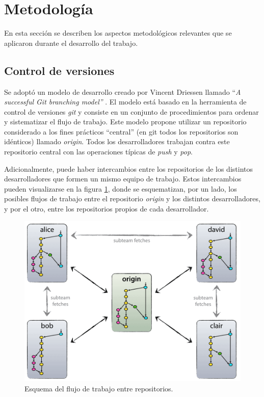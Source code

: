 


\section{Metodología}

En esta sección se describen los aspectos metodológicos relevantes que se aplicaron durante el desarrollo del trabajo.  

\subsection{Control de versiones}
\label{subsec:branching}

Se adoptó un modelo de desarrollo creado por Vincent Driessen llamado ``\textit{A successful Git branching model''} \citep{Driessen}.  El modelo está basado en la herramienta de control de versiones \textit{git} y consiste en un conjunto de procedimientos para ordenar y sistematizar el flujo de trabajo. Este modelo propone utilizar un repositorio considerado a los fines prácticos ``central'' (en git todos los repositorios son idénticos) llamado \textit{origin}.  Todos los desarrolladores trabajan contra este repositorio central con las operaciones típicas de \textit{push} y \textit{pop}.  

Adicionalmente, puede haber intercambios entre los repositorios de los distintos desarrolladores que formen un mismo equipo de trabajo. Estos intercambios pueden visualizarse en la figura \ref{fig:esquema-repos}, donde se esquematizan, por un lado, los posibles flujos de trabajo entre el repositorio \textit{origin} y los distintos desarrolladores, y por el otro, entre los repositorios propios de cada desarrollador. 

\begin{figure}[ht]
	\centering
	\includegraphics[width=.6\textwidth]{./Figures/centr-decentr@2x.png}
	\caption[Esquema del flujo de trabajo entre repositorios]{Esquema del flujo de trabajo entre repositorios\protect\footnotemark.}
	\label{fig:esquema-repos}
\end{figure}

